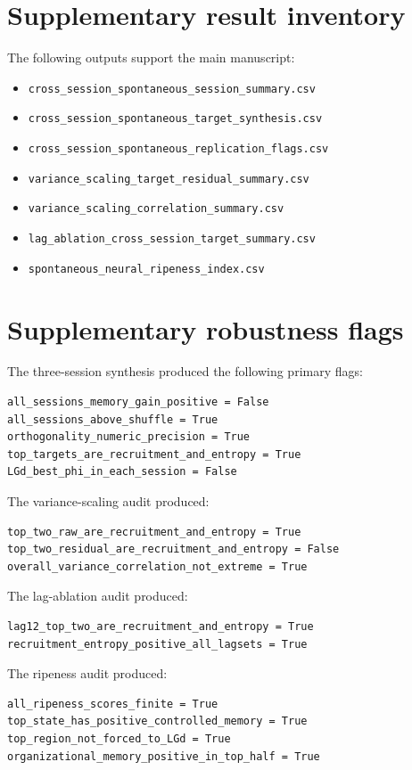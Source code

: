\documentclass[11pt]{article}
\begin{document}



\appendix

\section{Supplementary result inventory}

The following outputs support the main manuscript:

\begin{itemize}
    \item \texttt{cross\_session\_spontaneous\_session\_summary.csv}
    \item \texttt{cross\_session\_spontaneous\_target\_synthesis.csv}
    \item \texttt{cross\_session\_spontaneous\_replication\_flags.csv}
    \item \texttt{variance\_scaling\_target\_residual\_summary.csv}
    \item \texttt{variance\_scaling\_correlation\_summary.csv}
    \item \texttt{lag\_ablation\_cross\_session\_target\_summary.csv}
    \item \texttt{spontaneous\_neural\_ripeness\_index.csv}
\end{itemize}

\section{Supplementary robustness flags}

The three-session synthesis produced the following primary flags:

\begin{verbatim}
all_sessions_memory_gain_positive = False
all_sessions_above_shuffle = True
orthogonality_numeric_precision = True
top_targets_are_recruitment_and_entropy = True
LGd_best_phi_in_each_session = False
\end{verbatim}

The variance-scaling audit produced:

\begin{verbatim}
top_two_raw_are_recruitment_and_entropy = True
top_two_residual_are_recruitment_and_entropy = False
overall_variance_correlation_not_extreme = True
\end{verbatim}

The lag-ablation audit produced:

\begin{verbatim}
lag12_top_two_are_recruitment_and_entropy = True
recruitment_entropy_positive_all_lagsets = True
\end{verbatim}

The ripeness audit produced:

\begin{verbatim}
all_ripeness_scores_finite = True
top_state_has_positive_controlled_memory = True
top_region_not_forced_to_LGd = True
organizational_memory_positive_in_top_half = True
\end{verbatim}
\end{document}
